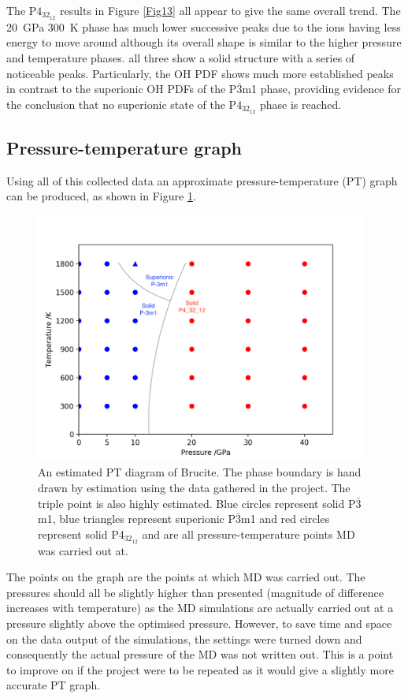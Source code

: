 \documentclass[a4paper,12pt]{article}
\begin{document}
The P$4_32_12$ results in Figure \ref{Fig13} all appear to give the same overall trend. The \SI{20}{\GPa} \SI{300}{\K} phase has much lower successive peaks due to the ions having less energy to move around although its overall shape is similar to the higher pressure and temperature phases. all three show a solid structure with a series of noticeable peaks. Particularly, the OH PDF shows much more established peaks in contrast to the superionic OH PDFs of the P$\bar3$m1 phase, providing evidence for the conclusion that no superionic state of the P$4_32_12$ phase is reached.

\subsection{Pressure-temperature graph}

Using all of this collected data an approximate pressure-temperature (PT) graph can be produced, as shown in Figure \ref{PT}.

\begin{figure}[h!!!!!!!!]
	\centering
	\includegraphics[width=11cm]{figures/PT_graph.png}
	\caption{An estimated PT diagram of Brucite. The phase boundary is hand drawn by estimation using the data gathered in the project. The triple point is also highly estimated. Blue circles represent solid P$\bar3$m1, blue triangles represent superionic P$\bar3$m1 and red circles represent solid P4$_32_12$ and are all pressure-temperature points MD was carried out at.}
	\label{PT}
\end{figure}

The points on the graph are the points at which MD was carried out. The pressures should all be slightly higher than presented (magnitude of difference increases with temperature) as the MD simulations are actually carried out at a pressure slightly above the optimised pressure. However, to save time and space on the data output of the simulations, the settings were turned down and consequently the actual pressure of the MD was not written out. This is a point to improve on if the project were to be repeated as  it would give a slightly more accurate PT graph. 
\end{document}
